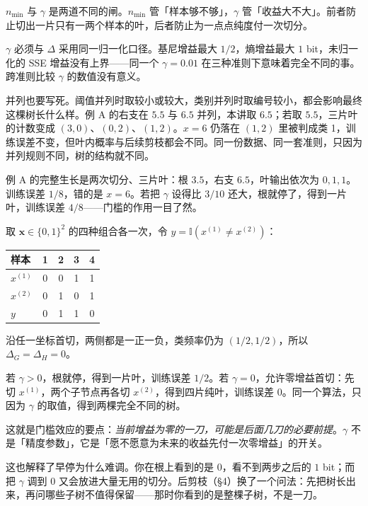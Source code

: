 \documentclass[11pt,a4paper,fontset=windows,zihao=-4]{ctexart}
\newcommand{\bx}{\boldsymbol{x}}
\newcommand{\Ind}{\mathbb{I}}
\newcommand{\tabhead}{\sffamily\bfseries\color{navy}}
\begin{document}
$n_{\min}$ 与 $\gamma$ 是两道不同的闸。$n_{\min}$ 管「样本够不够」，$\gamma$ 管「收益大不大」。前者防止切出一片只有一两个样本的叶，后者防止为一点点纯度付一次切分。

$\gamma$ 必须与 $\Delta$ 采用同一归一化口径。基尼增益最大 $1/2$，熵增益最大 $1$ bit，未归一化的 SSE 增益没有上界——同一个 $\gamma=0.01$ 在三种准则下意味着完全不同的事。跨准则比较 $\gamma$ 的数值没有意义。

并列也要写死。阈值并列时取较小或较大，类别并列时取编号较小，都会影响最终这棵树长什么样。例 A 的右支在 $5.5$ 与 $6.5$ 并列，本讲取 $6.5$；若取 $5.5$，三片叶的计数变成 $(3,0)$、$(0,2)$、$(1,2)$。$x=6$ 仍落在 $(1,2)$ 里被判成类 1，训练误差不变，但叶内概率与后续剪枝都会不同。同一份数据、同一套准则，只因为并列规则不同，树的结构就不同。

例 A 的完整生长是两次切分、三片叶：根 $3.5$，右支 $6.5$，叶输出依次为 $0,1,1$。训练误差 $1/8$，错的是 $x=6$。若把 $\gamma$ 设得比 $3/10$ 还大，根就停了，得到一片叶，训练误差 $4/8$——门槛的作用一目了然。

\begin{exm}[异或：门槛把树挡在根上]
取 $\bx\in\{0,1\}^2$ 的四种组合各一次，令 $y=\Ind(x^{(1)}\ne x^{(2)})$：
\begin{center}
\small
\begin{tabular}{@{}lcccc@{}}
\toprule
\rowcolor{navy!7}
\tabhead 样本 & 1 & 2 & 3 & 4\\
\midrule
$x^{(1)}$ & 0 & 0 & 1 & 1\\
$x^{(2)}$ & 0 & 1 & 0 & 1\\
$y$ & 0 & 1 & 1 & 0\\
\bottomrule
\end{tabular}
\end{center}
沿任一坐标首切，两侧都是一正一负，类频率仍为 $(1/2,1/2)$，所以 $\Delta_G=\Delta_H=0$。

若 $\gamma>0$，根就停，得到一片叶，训练误差 $1/2$。若 $\gamma=0$，允许零增益首切：先切 $x^{(1)}$，两个子节点再各切 $x^{(2)}$，得到四片纯叶，训练误差 $0$。同一个算法，只因为 $\gamma$ 的取值，得到两棵完全不同的树。

这就是门槛效应的要点：\emph{当前增益为零的一刀，可能是后面几刀的必要前提}。$\gamma$ 不是「精度参数」，它是「愿不愿意为未来的收益先付一次零增益」的开关。
\end{exm}

这也解释了早停为什么难调。你在根上看到的是 $0$，看不到两步之后的 $1$ bit；而把 $\gamma$ 调到 $0$ 又会放进大量无用的切分。后剪枝（§4）换了一个问法：先把树长出来，再问哪些子树不值得保留——那时你看到的是整棵子树，不是一刀。
\end{document}
